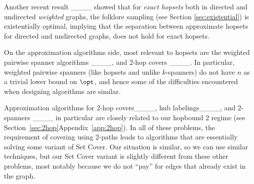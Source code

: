 Another recent result ____ showed that for \textit{exact hopsets} both in directed and undirected \textit{weighted} graphs, the folklore sampling (see Section \ref{sec:existential}) is existentially optimal, implying that the separation between approximate hopsets for directed and undirected graphs, does not hold for exact hopsets.


On the approximation algorithms side, most relevant to hopsets are the weighted pairwise spanner algorithms ____, and 2-hop covers ____. In particular, weighted pairwise spanners (like hopsets and unlike $k$-spanners) do not have $n$ as a trivial lower bound on $\opt$, and hence some of the difficulties encountered when designing algorithms are similar. 


Approximation algorithms for 2-hop covers____, hub labelings____, and 2-spanners ____ in particular are closely related to our hopbound $2$ regime (see \iflong Section~\ref{sec:2hop}\else Appendix~\ref{app:2hop}\fi).  In all of these problems, the requirement of covering using 2-paths leads to algorithms that are essentially solving some variant of Set Cover.  Our situation is similar, so we can use similar techniques, but our Set Cover variant is slightly different from these other problems, most notably because we do not ``pay'' for edges that already exist in the graph. 



